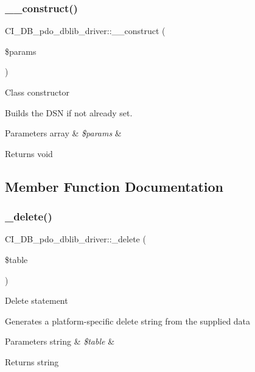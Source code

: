 \subsubsection{\texorpdfstring{\+\_\+\+\_\+construct()}{\_\_construct()}}
{\footnotesize\ttfamily C\+I\+\_\+\+D\+B\+\_\+pdo\+\_\+dblib\+\_\+driver\+::\+\_\+\+\_\+construct (\begin{DoxyParamCaption}\item[{}]{\$params }\end{DoxyParamCaption})}

Class constructor

Builds the D\+SN if not already set.


\begin{DoxyParams}[1]{Parameters}
array & {\em \$params} & \\
\hline
\end{DoxyParams}
\begin{DoxyReturn}{Returns}
void 
\end{DoxyReturn}


\subsection{Member Function Documentation}
\mbox{\label{class_c_i___d_b__pdo__dblib__driver_a546c9873a327d1b374ce0dea213d5f82}} 
\subsubsection{\texorpdfstring{\+\_\+delete()}{\_delete()}}
{\footnotesize\ttfamily C\+I\+\_\+\+D\+B\+\_\+pdo\+\_\+dblib\+\_\+driver\+::\+\_\+delete (\begin{DoxyParamCaption}\item[{}]{\$table }\end{DoxyParamCaption})\hspace{0.3cm}{\ttfamily [protected]}}

Delete statement

Generates a platform-\/specific delete string from the supplied data


\begin{DoxyParams}[1]{Parameters}
string & {\em \$table} & \\
\hline
\end{DoxyParams}
\begin{DoxyReturn}{Returns}
string 
\end{DoxyReturn}
\mbox{\label{class_c_i___d_b__pdo__dblib__driver_a90c48d04f257bf9685399205984829a3}} 
